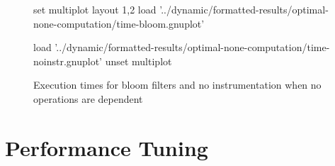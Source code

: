 \begin{figure}
	\centering
	\begin{gnuplot}[terminal=pdf]
	set multiplot layout 1,2
		load '../dynamic/formatted-results/optimal-none-computation/time-bloom.gnuplot'
		
		load '../dynamic/formatted-results/optimal-none-computation/time-noinstr.gnuplot'
	unset multiplot
	\end{gnuplot}
	\caption{Execution times for bloom filters and no instrumentation when no operations are dependent}
	\label{chart:real-time-hashnoinstty}
\end{figure}

\section{Performance Tuning} \label{sec:results/tuning}
